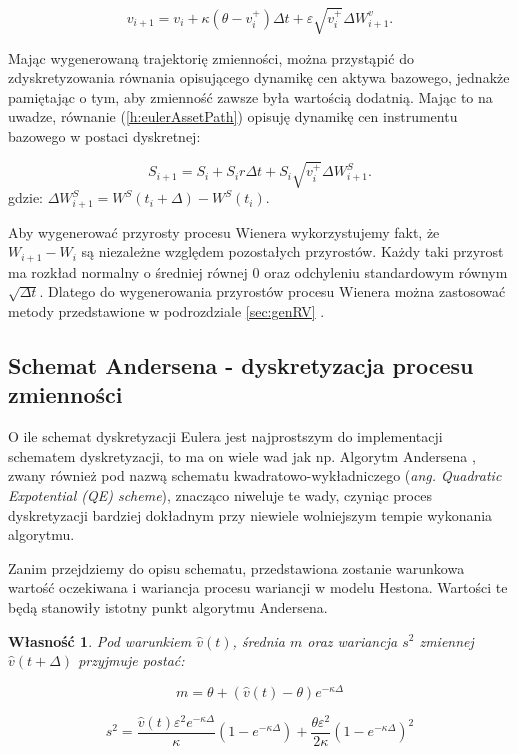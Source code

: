 \documentclass{pracamgr}
\newtheorem{prop}{Własność}
\begin{document}
\begin{equation}\label{h:eulerNonZero}
v_{i+1}  = v_i + \kappa (\theta - v_i^+) \Delta t + \varepsilon \sqrt{v_i^+} \Delta W^{v}_{i+1}.
\end{equation}

Mając wygenerowaną trajektorię zmienności, można przystąpić do zdyskretyzowania równania opisującego 
dynamikę cen aktywa bazowego, jednakże pamiętając o tym, aby zmienność zawsze była wartością 
dodatnią. 
Mając to na uwadze, równanie (\ref{h:eulerAssetPath}) opisuję dynamikę cen instrumentu bazowego w 
postaci dyskretnej:

\begin{equation}\label{h:eulerAssetPath}
S_{i+1} = S_i + S_i r \Delta t + S_i \sqrt{v_i^+}  \Delta W_{i+1}^S.
\end{equation}
gdzie: $\Delta W^{S}_{i+1} = W^{S} (t_i+\Delta) - W^{S} (t_i)$.
  
Aby wygenerować przyrosty procesu Wienera wykorzystujemy fakt, że $W_{i+1}  - W_{i}$ są niezależne 
względem pozostałych przyrostów. 
Każdy taki przyrost ma rozkład normalny o średniej równej $0$ oraz odchyleniu standardowym 
równym $\sqrt{\Delta t}$. 
Dlatego do wygenerowania przyrostów procesu Wienera można zastosować metody przedstawione w 
podrozdziale \ref{sec:genRV} \cite{Glasserman}.


\subsection{Schemat Andersena - dyskretyzacja procesu zmienności}
\label{sec:algorytm_andersena}
O ile schemat dyskretyzacji Eulera jest najprostszym do implementacji schematem dyskretyzacji, to ma 
on wiele wad jak np.  
Algorytm Andersena \cite{Andersen}, zwany również pod nazwą schematu 
kwadratowo-wykładniczego (\textit{ang. Quadratic Expotential (QE) scheme}),
znacząco niweluje te wady, czyniąc proces dyskretyzacji bardziej dokładnym przy niewiele wolniejszym 
tempie wykonania algorytmu. 

Zanim przejdziemy do opisu schematu, przedstawiona zostanie warunkowa wartość oczekiwana i wariancja 
procesu wariancji w modelu Hestona. Wartości te będą stanowiły istotny punkt algorytmu Andersena.
\begin{prop}
Pod warunkiem $\hat{v}(t)$, średnia $m$ oraz wariancja $s^2$ zmiennej $\hat{v}(t + \Delta)$ przyjmuje 
postać:

\begin{equation}
  \label{eq:m}
  m= \theta + (\hat{v}(t) - \theta) e^{-\kappa \Delta}
\end{equation}

\begin{equation}
  \label{eq:s2}
  s^2 = \frac{\hat{v}(t)\varepsilon^2 e^{-\kappa \Delta}}{\kappa} (1 - e^{-\kappa \Delta}) 
  + \frac{\theta \varepsilon^2}{2 \kappa}(1 - e^{-\kappa \Delta})^2
\end{equation}
\end{prop}
 
\end{document}
